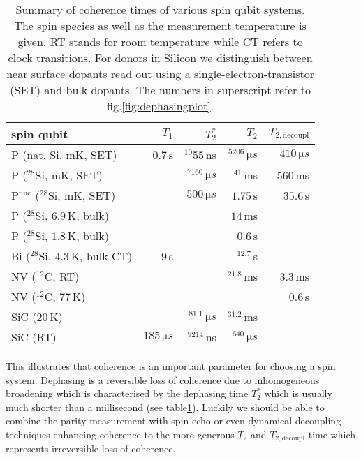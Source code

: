 \bgroup
\def\arraystretch{1.3}%
\begin{table}[H] 
	\footnotesize 
	\begin{tabular}{lrrrr}
		\hline
		spin qubit & $T_1$ & $T_2^{*}$ & $T_2$ & $T_{2,\textrm{decoupl}}$ \\ \hline 
		P (nat. Si, mK, SET) \cite{Pla2012}& $0.7\, $s & $^{10}55\, $ns  & $^5206\, \si{\micro s}$ & $410\, \si{\micro s}$  \\
		P ($^{28}$Si, mK, SET) \cite{Muhonen2014}&  & $^7160\, \si{\micro s}$  & $^41\, $ms & $560\, $ms \\
		P$^{\text{nuc}}$ ($^{28}$Si, mK, SET) \cite{Muhonen2014}& & $500\, \si{\micro s}$ & $1.75\, $s & $35.6\, $s \\
		P ($^{28}$Si, $6.9\, $K, bulk) \cite{Morley2010}& &  & $14\, $ms &  \\
		P ($^{28}$Si, $1.8\, $K, bulk) \cite{Tyryshkin2011}& &  & $0.6\, $s &  \\
		Bi ($^{28}$Si, $4.3\, $K, bulk CT) \cite{Wolfowicz2013} & $9\, $s &  & $^12.7\, $s &\\
		NV ($^{12}$C, RT) \cite{Balasubramanian2009,Bar-Gill2013} & & & $^21.8\, $ms & $3.3\, $ms \\
		NV ($^{12}$C, $77\, $K) \cite{Bar-Gill2013} & & &  & $0.6\, $s \\
		SiC ($20\, $K) \cite{Christle2014} & & $^81.1\, \si{\micro s}$ & $^31.2\, $ms &  \\
		SiC (RT) \cite{Koehl2011} & $185\, \si{\micro s}$ & $^9214\, $ns & $^640\, \si{\micro s}$ &   \\
		\hline
	\end{tabular} 
	\caption{Summary of coherence times of various spin qubit systems. The spin species as well as the measurement temperature is given. RT stands for room temperature while CT refers to clock transitions. For donors in Silicon we distinguish between near surface dopants read out using a single-electron-transistor (SET) and bulk dopants. The numbers in superscript refer to fig.\@ \ref{fig:dephasingplot}.}
	\label{TAB:qubits}
\end{table}
\egroup




This illustrates that coherence is an important parameter for choosing a spin system. Dephasing is a reversible loss of coherence due to inhomogeneous broadening which is characterised by the dephasing time $T_2^*$ which is usually much shorter than a millisecond (see table\@ \ref{TAB:qubits}). Luckily we should be able to combine the parity measurement with spin echo or even dynamical decoupling techniques enhancing coherence to the more generous $T_2$ and $T_{2,\textrm{decoupl}}$ time which represents irreversible loss of coherence.

